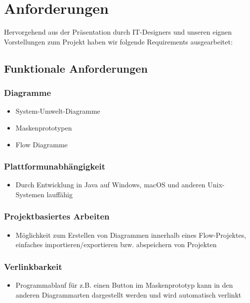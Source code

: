 \section{Anforderungen}
Hervorgehend aus der Präsentation durch IT-Designers und unseren eignen Vorstellungen zum Projekt haben wir folgende Requirements ausgearbeitet:

\subsection{Funktionale Anforderungen}

\subsubsection{Diagramme}
\begin{itemize}
	\item System-Umwelt-Diagramme
	\item Maskenprototypen
	\item Flow Diagramme
\end{itemize}

\subsubsection{Plattformunabhängigkeit}
\begin{itemize}
	\item Durch Entwicklung in Java auf Windows, macOS und anderen Unix-Systemen lauffähig
\end{itemize}

\subsubsection{Projektbasiertes Arbeiten}
\begin{itemize}
	\item Möglichkeit zum Erstellen von Diagrammen innerhalb eines Flow-Projektes, einfaches importieren/exportieren bzw. abspeichern von Projekten
\end{itemize}

\subsubsection{Verlinkbarkeit}
\begin{itemize}
	\item Programmablauf für z.B. einen Button im Maskenprototyp kann in den anderen Diagrammarten dargestellt werden und wird automatisch verlinkt 
\end{itemize}

